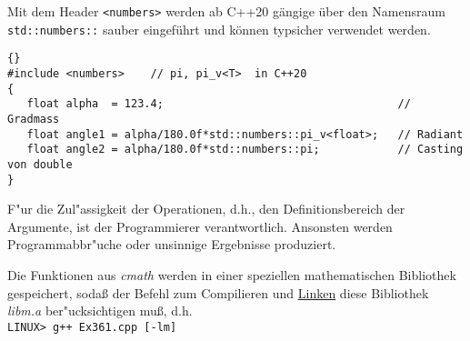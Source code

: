 Mit dem Header \verb|<numbers>| werden ab C++20 gängige 
über den Namensraum \verb|std::numbers::|
sauber eingeführt und können typsicher verwendet werden.
\begin{lstlisting}[caption=Konstanten in C++20,label=lst:3_6_1,basicstyle=\scriptsize]{}
#include <numbers>    // pi, pi_v<T>  in C++20
{
   float alpha  = 123.4;                                    // Gradmass
   float angle1 = alpha/180.0f*std::numbers::pi_v<float>;   // Radiant
   float angle2 = alpha/180.0f*std::numbers::pi;            // Casting von double
}
\end{lstlisting}


F"ur die Zul"assigkeit der Operationen, d.h., den Definitionsbereich der
Argumente, ist der Programmierer verantwortlich. Ansonsten werden
Programmabbr"uche oder unsinnige Ergebnisse produziert.
%

\begin{minipage}{0.99\textwidth}
Die Funktionen aus \textit{cmath} werden in einer speziellen mathematischen
Bibliothek gespeichert, {soda\ss} der Befehl zum Compilieren und
\underline{Linken} diese
Bibliothek \textit{libm.a} ber"ucksichtigen {mu\ss}, d.h.
\nopagebreak
\\
\nopagebreak
\texttt{LINUX> g++ Ex361.cpp [-lm]}
\end{minipage}
%
%
\ifcteil
